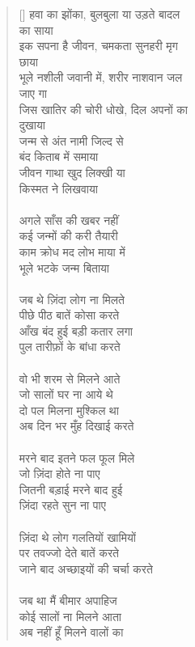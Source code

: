 \begin{verse}[\versewidth]\texthindi{
हवा का झोंका, बुलबुला या उड़ते बादल\\
का साया\\
इक सपना है जीवन, चमकता सुनहरी मृग\\
छाया\\
भूले नशीली जवानी में, शरीर नाशवान जल\\
जाए गा\\
जिस खातिर की चोरी धोखे, दिल अपनों का\\
दुखाया\\
जन्म से अंत नामी जिल्द से\\
बंद किताब में समाया\\
जीवन गाथा खुद लिक्खी या\\
किस्मत ने लिखवाया\\
\\
अगले साँस की खबर नहीं\\
कई जन्मों की करी तैयारी\\
काम क्रोध मद लोभ माया में\\
भूले भटके जन्म बिताया\\
\\
जब थे ज़िंदा लोग ना मिलते\\
पीछे पीठ बातें कोसा करते\\
आँख बंद हुई बड़ी कतार लगा\\
पुल तारीफ़ों के बांधा करते\\
\\
वो भी शरम से मिलने आते\\
जो सालों घर ना आये थे\\
दो पल मिलना मुश्किल था\\
अब दिन भर मुँह दिखाई करते\\
\\
मरने बाद इतने फल फूल मिले\\
जो ज़िंदा होते ना पाए\\
जितनी बड़ाई मरने बाद हुई\\
ज़िंदा रहते सुन ना पाए\\
\\
ज़िंदा थे लोग गलतियों खामियों\\
पर तवज्जो देते बातें करते\\
जाने बाद अच्छाइयों की चर्चा करते\\
\\
जब था मैं बीमार अपाहिज \\
कोई सालों ना मिलने आता\\
अब नहीं हूँ मिलने वालों का\\
}
\end{verse}
